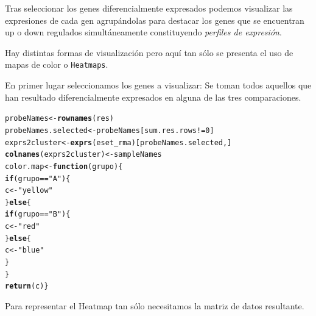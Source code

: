 \documentclass[a4paper]{article}\usepackage[]{graphicx}\usepackage[]{color}
\makeatletter
\newcommand{\hlnum}[1]{\textcolor[rgb]{0.686,0.059,0.569}{#1}}%
\newcommand{\hlstr}[1]{\textcolor[rgb]{0.192,0.494,0.8}{#1}}%
\newcommand{\hlopt}[1]{\textcolor[rgb]{0,0,0}{#1}}%
\newcommand{\hlstd}[1]{\textcolor[rgb]{0.345,0.345,0.345}{#1}}%
\newcommand{\hlkwa}[1]{\textcolor[rgb]{0.161,0.373,0.58}{\textbf{#1}}}%
\newcommand{\hlkwb}[1]{\textcolor[rgb]{0.69,0.353,0.396}{#1}}%
\newcommand{\hlkwc}[1]{\textcolor[rgb]{0.333,0.667,0.333}{#1}}%
\newcommand{\hlkwd}[1]{\textcolor[rgb]{0.737,0.353,0.396}{\textbf{#1}}}%
\newenvironment{kframe}{%
 \def\at@end@of@kframe{}%
 \ifinner\ifhmode%
  \def\at@end@of@kframe{\end{minipage}}%
  \begin{minipage}{\columnwidth}%
 \fi\fi%
 \def\FrameCommand##1{\hskip\@totalleftmargin \hskip-\fboxsep
 \colorbox{shadecolor}{##1}\hskip-\fboxsep
     \hskip-\linewidth \hskip-\@totalleftmargin \hskip\columnwidth}%
 \MakeFramed {\advance\hsize-\width
   \@totalleftmargin\z@ \linewidth\hsize
   \@setminipage}}%
 {\par\unskip\endMakeFramed%
 \at@end@of@kframe}
\newenvironment{knitrout}{}{} %
\makeatother
\begin{document}
Tras seleccionar los genes diferencialmente expresados podemos visualizar 
las expresiones de cada gen agrupándolas para destacar los genes que se 
encuentran up o down regulados simultáneamente constituyendo \emph{perfiles de expresión}.

Hay distintas formas de visualización pero aquí tan sólo se presenta el uso de mapas de color o 
\texttt{Heatmaps}.

En primer lugar seleccionamos los genes a visualizar: Se toman todos aquellos que 
han resultado diferencialmente expresados en alguna de las tres comparaciones.

\begin{knitrout}
\color{fgcolor}\begin{kframe}
\begin{alltt}
\hlstd{probeNames}\hlkwb{<-}\hlkwd{rownames}\hlstd{(res)}
\hlstd{probeNames.selected}\hlkwb{<-}\hlstd{probeNames[sum.res.rows}\hlopt{!=}\hlnum{0}\hlstd{]}
\hlstd{exprs2cluster} \hlkwb{<-}\hlkwd{exprs}\hlstd{(eset_rma)[probeNames.selected,]}
\hlkwd{colnames}\hlstd{(exprs2cluster)}\hlkwb{<-}\hlstd{sampleNames}
\hlstd{color.map} \hlkwb{<-} \hlkwa{function}\hlstd{(}\hlkwc{grupo}\hlstd{) \{}
  \hlkwa{if} \hlstd{(grupo}\hlopt{==}\hlstr{"A"}\hlstd{)\{}
    \hlstd{c}\hlkwb{<-} \hlstr{"yellow"}
  \hlstd{\}}\hlkwa{else}\hlstd{\{}
    \hlkwa{if} \hlstd{(grupo}\hlopt{==}\hlstr{"B"}\hlstd{)\{}
      \hlstd{c}\hlkwb{<-} \hlstr{"red"}
    \hlstd{\}}\hlkwa{else}\hlstd{\{}
      \hlstd{c}\hlkwb{<-} \hlstr{"blue"}
   \hlstd{\}}
  \hlstd{\}}
\hlkwd{return}\hlstd{(c)\}}
\end{alltt}
\end{kframe}
\end{knitrout}

Para representar el Heatmap tan sólo necesitamos la matriz de datos resultante.
\end{document}
